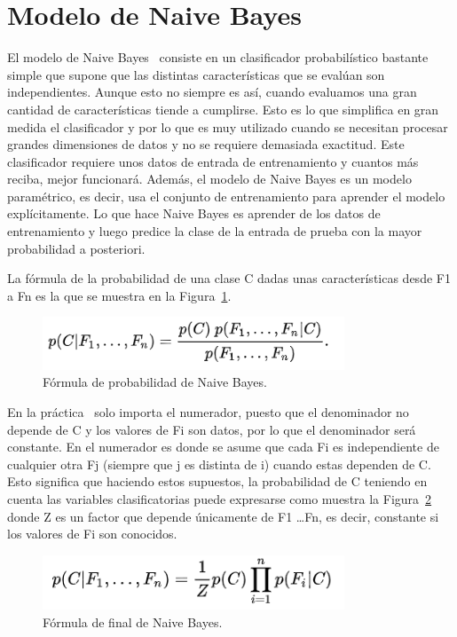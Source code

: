 \documentclass[a4paper, 12pt]{book}
\begin{document}
\section{Modelo de Naive Bayes} 
\label{sec:modelobayes}

El modelo de Naive Bayes~\cite{articulobayes} consiste en un clasificador probabilístico bastante simple que supone que las distintas características que se evalúan son independientes. Aunque esto no siempre es así, cuando evaluamos una gran cantidad de características tiende a cumplirse. Esto es lo que simplifica en gran medida el clasificador y por lo que es muy utilizado cuando se necesitan procesar grandes dimensiones de datos y no se requiere demasiada exactitud. Este clasificador requiere unos datos de entrada de entrenamiento y cuantos más reciba, mejor funcionará. Además, el modelo de Naive Bayes es un modelo paramétrico, es decir, usa el conjunto de entrenamiento para aprender el modelo explícitamente. Lo que hace Naive Bayes es aprender de los datos de entrenamiento y luego predice la clase de la entrada de prueba con la mayor probabilidad a posteriori.

La fórmula de la probabilidad de una clase C dadas unas características desde F1 a Fn es la que se muestra en la Figura~\ref{fig:formulabayes}.

\begin{figure}
	\centering
	\includegraphics[width=9cm, keepaspectratio]{img/formulabayes}
	\caption{Fórmula de probabilidad de Naive Bayes.}
	\label{fig:formulabayes}
\end{figure}

En la práctica~\cite{machinelearning} solo importa el numerador, puesto que el denominador no depende de C y los valores de Fi son datos, por lo que el denominador será constante. En el numerador es donde se asume que cada Fi es independiente de cualquier otra Fj (siempre que j es distinta de i) cuando estas dependen de C. Esto significa que haciendo estos supuestos, la probabilidad de C teniendo en cuenta las variables clasificatorias puede expresarse como muestra la Figura~\ref{fig:ffinalbayes} donde Z es un factor que depende únicamente de F1 \dots Fn, es decir, constante si los valores de Fi son conocidos.

\begin{figure}
	\centering
	\includegraphics[width=9cm, keepaspectratio]{img/ffinalbayes}
	\caption{Fórmula de final de Naive Bayes.}\label{fig:ffinalbayes}
\end{figure}
\end{document}
